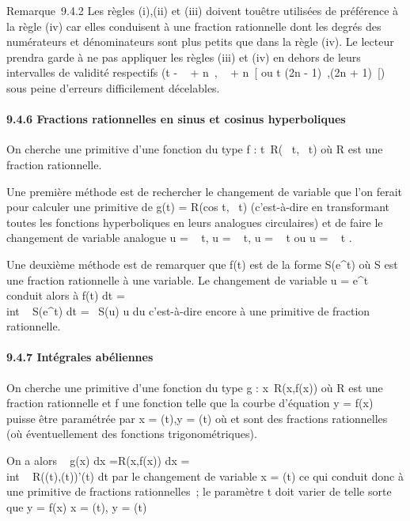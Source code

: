 \documentclass[]{article}
\begin{document}
Remarque~9.4.2 Les règles (i),(ii) et (iii) doivent tou\jmathours être
utilisées de préférence à la règle (iv) car elles conduisent à une
fraction rationnelle dont les degrés des numérateurs et dénominateurs
sont plus petits que dans la règle (iv). Le lecteur prendra garde à ne
pas appliquer les règles (iii) et (iv) en dehors de leurs intervalles de
validité respectifs (t \in{]} - \pi~  + n\pi~, \pi~
 + n\pi~{[} ou t \in{]}(2n - 1)\pi~,(2n + 1)\pi~{[}) sous
peine d'erreurs difficilement décelables.

\paragraph{9.4.6 Fractions rationnelles en sinus et cosinus
hyperboliques}

On cherche une primitive d'une fonction du type f :
t\mapsto~R(\mathrmch~
t,\mathrmsh~ t) où R est une
fraction rationnelle.

Une première méthode est de rechercher le changement de variable que
l'on ferait pour calculer une primitive de g(t) =
R(cos t,\sin~ t)
(c'est-à-dire en transformant toutes les fonctions hyperboliques en
leurs analogues circulaires) et de faire le changement de variable
analogue u = \mathrmsh~ t, u
= \mathrmch~ t, u
= \mathrmth~ t ou u
= \mathrmth~  t
 .

Une deuxième méthode est de remarquer que f(t) est de la forme
S(e^t) où S est une fraction rationnelle à une variable. Le
changement de variable u = e^t conduit alors à
\int  f(t) dt =\\int ~
S(e^t) dt =\int ~  S(u)
\over u du c'est-à-dire encore à une primitive de
fraction rationnelle.

\paragraph{9.4.7 Intégrales abéliennes}

On cherche une primitive d'une fonction du type g :
x\mapsto~R(x,f(x)) où R est une fraction rationnelle
et f une fonction telle que la courbe d'équation y = f(x) puisse être
paramétrée par x = \phi(t),y = \psi(t) où \phi et \psi sont des fractions
rationnelles (où éventuellement des fonctions trigonométriques).

On a alors \int ~ g(x) dx
=\int  R(x,f(x)) dx =\\int ~
R(\phi(t),\psi(t))\phi'(t) dt par le changement de variable x = \phi(t) ce qui
conduit donc à une primitive de fractions rationnelles~; le paramètre t
doit varier de telle sorte que y = f(x) \Leftrightarrow x =
\phi(t), y = \psi(t)
\end{document}
